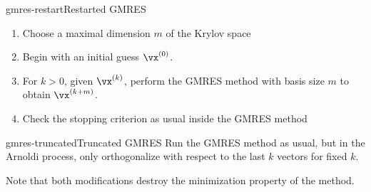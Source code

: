 \begin{Algorithm*}{gmres-restart}{Restarted GMRES}
  \begin{enumerate}
  \item Choose a maximal dimension $m$ of the Krylov space
  \item Begin with an initial guess $\vx^{(0)}$.
  \item For $k>0$, given $\vx^{(k)}$, perform the GMRES method with
    basis size $m$ to obtain $\vx^{(k+m)}$.
  \item Check the stopping criterion as usual inside the GMRES method
  \end{enumerate}
\end{Algorithm*}

\begin{Algorithm*}{gmres-truncated}{Truncated GMRES}
  Run the GMRES method as usual, but in the Arnoldi process, only
  orthogonalize with respect to the last $k$ vectors for fixed $k$.
\end{Algorithm*}

\begin{remark}
  Note that both modifications destroy the minimization property of the method.
\end{remark}


